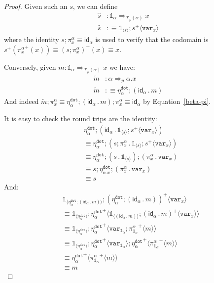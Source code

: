 \documentclass[10pt]{article}
\theoremstyle{definition}
\newcommand{\tcell}{\Rightarrow}
\newcommand{\id}{\mathsf{id}}
\newcommand\TrPlus[2]{\ensuremath{{#1}^+(#2)}}
\newcommand\El[2]{\mathcal{T}_{#1}(#2)}
\newcommand\bdot[0]{\mathbin{.}}
\newcommand\ApPlus[2]{\ensuremath{{#1}^+ \langle #2 \rangle }}
\newcommand{\tdot}{\ensuremath{\mathtt{dot}}}
\newcommand\One{\ensuremath{\mathds{1}}}
\newcommand\var[1]{\ensuremath{\mathtt{var}_{#1}}}
\newcommand\ApOne[1]{\ensuremath{\One_{\langle {#1} \rangle }}}
\begin{document}
\begin{proof}
Given such an $s$, we can define
\begin{align*}
\hat{s} &: \One_\alpha \tcell_{\El{p}{\alpha}} x \\
\hat{s} &:\equiv \ApOne{s};\ApPlus{s}{\var{x}}
\end{align*}
where the identity $s;\pi^\alpha_x \equiv \id_\alpha$ is used to verify that the codomain is $\TrPlus{s}{\TrPlus{\pi^\alpha_x}{x}} \equiv \TrPlus{(s;\pi^\alpha_x)}{x} \equiv x$.

Conversely, given $m : \One_\alpha \tcell_{\El{p}{\alpha}} x$ we have:
\begin{align*}
\tilde{m} &: \alpha \tcell_p \alpha.x \\
\tilde{m} &:\equiv \eta^\tdot_\alpha ; (\id_\alpha \bdot m)
\end{align*}
And indeed $\tilde{m};\pi^\alpha_x \equiv \eta^\tdot_\alpha ; (\id_\alpha \bdot m);\pi^\alpha_x \equiv \id_\alpha$ by Equation~\eqref{beta-pi}.

It is easy to check the round trips are the identity:
\begin{align*}
&\eta^\tdot_\alpha ; (\id_\alpha \bdot \ApOne{s};\ApPlus{s}{\var{x}}) \\
&\equiv \eta^\tdot_\alpha ; (s;\pi^\alpha_x \bdot \ApOne{s};\ApPlus{s}{\var{x}}) \\
&\equiv \eta^\tdot_\alpha ; (s \bdot \ApOne{s});(\pi^\alpha_x \bdot \var{x}) \\
&\equiv s;\eta^\tdot_{\alpha.x} ; (\pi^\alpha_x \bdot \var{x}) \\
&\equiv s
\end{align*}
And:
\begin{align*}
&\ApOne{\eta^\tdot_\alpha ; (\id_\alpha \bdot m)};\ApPlus{(\eta^\tdot_\alpha ; (\id_\alpha \bdot m))}{\var{x}} \\
&\equiv \ApOne{\eta^\tdot_\alpha};\ApPlus{\eta^\tdot_\alpha}{\ApOne{(\id_\alpha \bdot m)};\ApPlus{(\id_\alpha \bdot m)}{\var{x}}} \\
&\equiv \ApOne{\eta^\tdot_\alpha};\ApPlus{\eta^\tdot_\alpha}{\var{\One_\alpha};\ApPlus{\pi^\alpha_{\One_\alpha}}{m}} \\
&\equiv \ApOne{\eta^\tdot_\alpha};\ApPlus{\eta^\tdot_\alpha}{\var{\One_\alpha}};\ApPlus{\eta^\tdot_\alpha}{\ApPlus{\pi^\alpha_{\One_\alpha}}{m}} \\
&\equiv \ApPlus{\eta^\tdot_\alpha}{\ApPlus{\pi^\alpha_{\One_\alpha}}{m}} \\
&\equiv m
\end{align*}
\end{proof}
\end{document}
